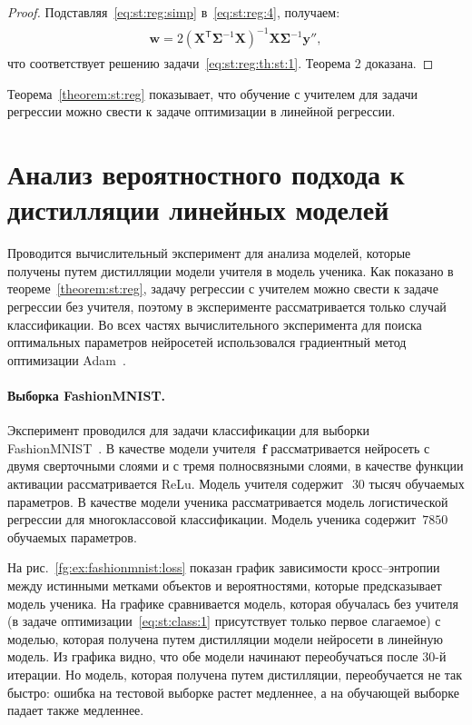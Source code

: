 \begin{proof}
Подставляя~\eqref{eq:st:reg:simp} в~\eqref{eq:st:reg:4}, получаем:
\begin{gather}
\label{eq:st:reg:5}
\begin{aligned}
\mathbf{w} = 2\left(\mathbf{X}^{\mathsf{T}}\bm{\Sigma}^{-1}\mathbf{X}\right)^{-1}\mathbf{X}\bm{\Sigma}^{-1}\mathbf{y''},
\end{aligned}
\end{gather}
что соответствует решению задачи~\eqref{eq:st:reg:th:st:1}. Теорема 2 доказана.
\end{proof}

Теорема~\ref{theorem:st:reg} показывает, что обучение с учителем для задачи регрессии можно свести к задаче оптимизации в линейной регрессии.

\section{Анализ вероятностного подхода к дистилляции линейных моделей}
Проводится вычислительный эксперимент для анализа моделей, которые получены путем дистилляции модели учителя в модель ученика. Как показано в теореме~\ref{theorem:st:reg}, задачу регрессии с учителем можно свести к задаче регрессии без учителя, поэтому в эксперименте рассматривается только случай классификации. Во всех частях вычислительного эксперимента для поиска оптимальных параметров нейросетей использовался градиентный метод оптимизации Adam~\cite{kingma2014}.

\paragraph{Выборка FashionMNIST.} Эксперимент проводился для задачи классификации для выборки FashionMNIST~\cite{fashionmnist}. В качестве модели учителя~$\mathbf{f}$ рассматривается нейросеть с двумя сверточными слоями и с тремя полносвязными слоями, в качестве функции активации рассматривается ReLu. Модель учителя содержит~$~30$ тысяч обучаемых параметров. В качестве модели ученика рассматривается модель логистической регрессии для многоклассовой классификации. Модель ученика содержит~$7850$ обучаемых параметров.

На рис.~\ref{fg:ex:fashionmnist:loss} показан график зависимости кросс--энтропии между истинными метками объектов и вероятностями, которые предсказывает модель ученика. На графике сравнивается модель, которая обучалась без учителя (в задаче оптимизации~\eqref{eq:st:class:1} присутствует только первое слагаемое) с моделью, которая получена путем дистилляции модели нейросети в линейную модель. Из графика видно, что обе модели начинают переобучаться после 30-й итерации. Но модель, которая получена путем дистилляции, переобучается не так быстро: ошибка на тестовой выборке растет медленнее, а на обучающей выборке падает также медленнее.

